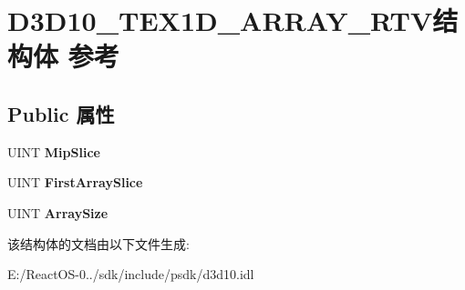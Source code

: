 \hypertarget{struct_d3_d10___t_e_x1_d___a_r_r_a_y___r_t_v}{}\section{D3\+D10\+\_\+\+T\+E\+X1\+D\+\_\+\+A\+R\+R\+A\+Y\+\_\+\+R\+T\+V结构体 参考}
\label{struct_d3_d10___t_e_x1_d___a_r_r_a_y___r_t_v}
\subsection*{Public 属性}
\begin{DoxyCompactItemize}
\item 
\mbox{\label{struct_d3_d10___t_e_x1_d___a_r_r_a_y___r_t_v_ac6b90e4d5d413a4e528d42e316217f64}} 
U\+I\+NT {\bfseries Mip\+Slice}
\item 
\mbox{\label{struct_d3_d10___t_e_x1_d___a_r_r_a_y___r_t_v_a4cf700e7d6cbd19b60b09c3ac0684040}} 
U\+I\+NT {\bfseries First\+Array\+Slice}
\item 
\mbox{\label{struct_d3_d10___t_e_x1_d___a_r_r_a_y___r_t_v_accaa4f0d383095eea8c0c31fe54c4475}} 
U\+I\+NT {\bfseries Array\+Size}
\end{DoxyCompactItemize}


该结构体的文档由以下文件生成\+:\begin{DoxyCompactItemize}
\item 
E\+:/\+React\+O\+S-\/0../sdk/include/psdk/d3d10.\+idl\end{DoxyCompactItemize}
